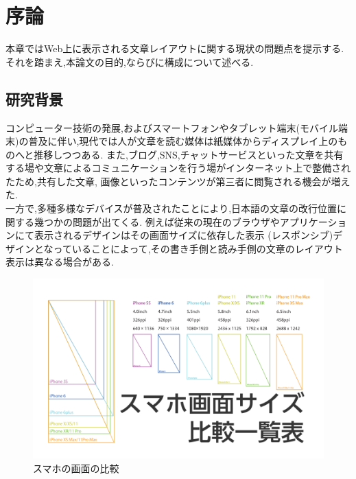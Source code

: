
\chapter{序論}
\label{chap:introduction}

本章ではWeb上に表示される文章レイアウトに関する現状の問題点を提示する.
それを踏まえ,本論⽂の目的,ならびに構成について述べる.

\newpage




\section{研究背景}

コンピューター技術の発展,およびスマートフォンやタブレット端末(モバイル端末)の普及に伴い,現代では人が文章を読む媒体は紙媒体からディスプレイ上のものへと推移しつつある.
また,ブログ,SNS,チャットサービスといった文章を共有する場や文章によるコミュニケーションを行う場がインターネット上で整備されたため,共有した文章, 
画像といったコンテンツが第三者に閲覧される機会が増えた.
\\一方で,多種多様なデバイスが普及されたことにより,日本語の文章の改行位置に関する幾つかの問題が出てくる.
例えば従来の現在のブラウザやアプリケーションにて表示されるデザインはその画面サイズに依存した表示
(レスポンシブ)デザインとなっていることによって,その書き手側と読み手側の文章のレイアウト表示は異なる場合がある.


\begin{figure}[H]
    \centering
    \label{fig:image1}
    \includegraphics[width=0.7\columnwidth]{image/01/img1.png}
    \caption[スマホの画面の比較] {スマホの画面の比較\footnotemark[1]}
\end{figure}



